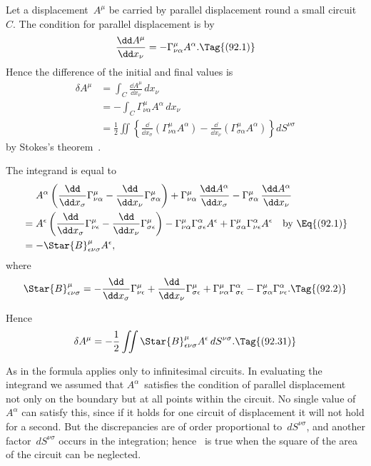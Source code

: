 \documentclass[12pt]{book}
\begin{document}
%

Let a displacement~$A^{\mu}$ be carried by parallel displacement round a small
circuit~$C$. The condition for parallel displacement is by~
\[
\frac{\dd A^{\mu}}{\dd x_{\nu}} = -\Gamma_{\nu\alpha}^{\mu} A^{\alpha}.
\Tag{(92.1)}
\]
Hence the difference of the initial and final values is
\begin{align*}
  \delta A^{\mu}
  &= \int_{C} \frac{\dd A^{\mu}}{\dd x_{\nu}}\, dx_{\nu} \\
  &= -\int_{C} \Gamma_{\nu\alpha}^{\mu} A^{\alpha}\, dx_{\nu} \\
  &= \frac{1}{2} \iint \left\{
  \frac{\dd}{\dd x_{\sigma}} (\Gamma_{\nu\alpha}^{\mu} A^{\alpha})
  - \frac{\dd}{\dd x_{\nu}} (\Gamma_{\sigma\alpha}^{\mu} A^{\alpha})\right\} dS^{\nu\sigma}
\end{align*}
by Stokes's theorem~.
%

The integrand is equal to
\begin{align*}
  &\phantom{{}={}} A^{\alpha} \left(\frac{\dd}{\dd x_{\sigma}} \Gamma_{\nu\alpha}^{\mu}
  - \frac{\dd}{\dd x_{\nu}} \Gamma_{\sigma\alpha}^{\mu}\right)
  + \Gamma_{\nu\alpha}^{\mu}\, \frac{\dd A^{\alpha}}{\dd x_{\sigma}}
  - \Gamma_{\sigma\alpha}^{\mu}\, \frac{\dd A^{\alpha}}{\dd x_{\nu}} \\
  &= A^{\epsilon} \left(\frac{\dd}{\dd x_{\sigma}} \Gamma_{\nu\epsilon}^{\mu}
  - \frac{\dd}{\dd x_{\nu}} \Gamma_{\sigma\epsilon}^{\mu}\right)
  - \Gamma_{\nu\alpha}^{\mu} \Gamma_{\sigma\epsilon}^{\alpha} A^{\epsilon}
  + \Gamma_{\sigma\alpha}^{\mu} \Gamma_{\nu\epsilon}^{\alpha} A^{\epsilon}
  \quad\text{by~\Eq{(92.1)}} \\
  &= -\Star{B}_{\epsilon\nu\sigma}^{\mu} A^{\epsilon},
\end{align*}
where
\[
\Star{B}_{\epsilon\nu\sigma}^{\mu}
= -\frac{\dd}{\dd x_{\sigma}} \Gamma_{\nu\epsilon}^{\mu}
+ \frac{\dd}{\dd x_{\nu}} \Gamma_{\sigma\epsilon}^{\mu}
+ \Gamma_{\nu\alpha}^{\mu} \Gamma_{\sigma\epsilon}^{\alpha}
- \Gamma_{\sigma\alpha}^{\mu} \Gamma_{\nu\epsilon}^{\alpha}.
\Tag{(92.2)}
\]

Hence
\[
\delta A^{\mu} = -\frac{1}{2} \iint \Star{B}_{\epsilon\nu\sigma}^{\mu} A^{\epsilon}\, dS^{\nu\sigma}.
\Tag{(92.31)}
\]

As in  the formula applies only to infinitesimal circuits. In evaluating
the integrand we assumed that $A^{\alpha}$~satisfies the condition of parallel displacement~
not only on the boundary but at all points within the circuit. No
single value of~$A^{\alpha}$ can satisfy this, since if it holds for one circuit of displacement
it will not hold for a second. But the discrepancies are of order proportional
to~$dS^{\nu\sigma}$, and another factor~$dS^{\nu\sigma}$ occurs in the integration; hence ~is
true when the square of the area of the circuit can be neglected.
\end{document}

